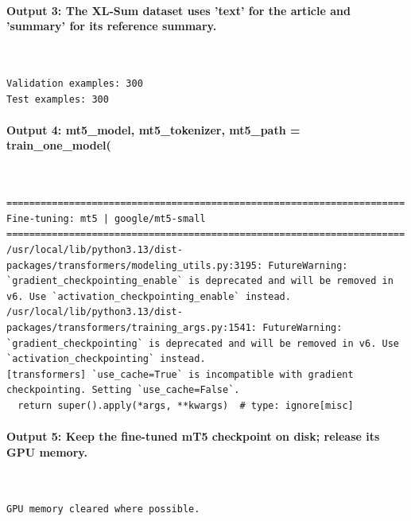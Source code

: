 \documentclass[12pt,a4paper,oneside]{report}
\begin{document}
\paragraph{Output 3: The XL-Sum dataset uses 'text' for the article and 'summary' for its reference summary.}\mbox{}\\[-1ex]
\begin{Verbatim}[commandchars=\\\{\},breaklines=true,breakanywhere=true,fontsize=\scriptsize,frame=leftline,framesep=2mm,rulecolor=\color{gray}]
Validation examples: 300
Test examples: 300
\end{Verbatim}
\paragraph{Output 4: mt5\_model, mt5\_tokenizer, mt5\_path = train\_one\_model(}\mbox{}\\[-1ex]
\begin{Verbatim}[commandchars=\\\{\},breaklines=true,breakanywhere=true,fontsize=\scriptsize,frame=leftline,framesep=2mm,rulecolor=\color{gray}]
======================================================================
Fine-tuning: mt5 | google/mt5-small
======================================================================
/usr/local/lib/python3.13/dist-packages/transformers/modeling_utils.py:3195: FutureWarning: `gradient_checkpointing_enable` is deprecated and will be removed in v6. Use `activation_checkpointing_enable` instead.
/usr/local/lib/python3.13/dist-packages/transformers/training_args.py:1541: FutureWarning: `gradient_checkpointing` is deprecated and will be removed in v6. Use `activation_checkpointing` instead.
[transformers] `use_cache=True` is incompatible with gradient checkpointing. Setting `use_cache=False`.
  return super().apply(*args, **kwargs)  # type: ignore[misc]
\end{Verbatim}
\paragraph{Output 5: Keep the fine-tuned mT5 checkpoint on disk; release its GPU memory.}\mbox{}\\[-1ex]
\begin{Verbatim}[commandchars=\\\{\},breaklines=true,breakanywhere=true,fontsize=\scriptsize,frame=leftline,framesep=2mm,rulecolor=\color{gray}]
GPU memory cleared where possible.
\end{Verbatim}
\end{document}
